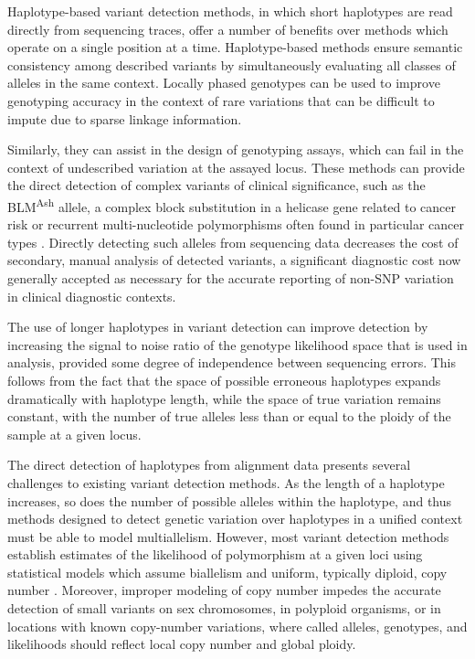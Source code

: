 \documentclass{article}
\begin{document}
Haplotype-based variant detection methods, in which short haplotypes are read directly from sequencing traces, offer a number of benefits over methods which operate on a single position at a time. Haplotype-based methods ensure semantic consistency among described variants by simultaneously evaluating all classes of alleles in the same context. 
Locally phased genotypes can be used to improve genotyping accuracy in the context of rare variations that can be difficult to impute due to sparse linkage information.

Similarly, they can assist in the design of genotyping
assays, which can fail in the context of undescribed variation at the assayed locus.  These methods can provide the direct detection of complex variants of clinical significance, such as the BLM\textsuperscript{Ash} allele, a complex block substitution in a helicase gene related to cancer risk \citep{blmash} or recurrent multi-nucleotide polymorphisms often found in particular cancer types \citep{recurrentTERT2013}.  Directly detecting such alleles from sequencing data decreases the cost of secondary, manual analysis of detected variants, a significant diagnostic cost now generally accepted as necessary for the accurate reporting of non-SNP variation in clinical diagnostic contexts.

The use of longer haplotypes in variant detection can improve detection by increasing the signal to noise ratio of the genotype likelihood space that is used in analysis, provided some degree of independence between sequencing errors.  This follows from the fact that the space of possible erroneous haplotypes expands dramatically with haplotype length, while the space of true variation remains constant, with the number of true alleles less than or equal to the ploidy of the sample at a given locus.

The direct detection of haplotypes from alignment data presents several challenges to existing variant detection methods.  As the length of a haplotype increases, so does the number of possible alleles within the haplotype, and thus methods designed to detect genetic variation over haplotypes in a unified context must be able to model multiallelism.  However, most variant detection methods establish estimates of the likelihood of polymorphism at a given loci using statistical models which assume biallelism \citep{li2011stats,marth99} and uniform, typically diploid, copy number \citep{gatk2011}.  Moreover, improper modeling of copy number impedes the accurate detection of small variants on sex chromosomes, in polyploid organisms, or in locations with known copy-number variations, where called alleles, genotypes, and likelihoods should reflect local copy number and global ploidy.
\end{document}

